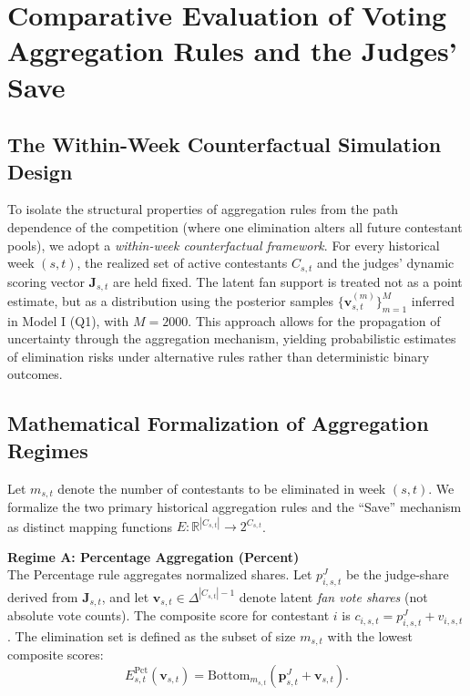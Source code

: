 \section{\textbf{Comparative Evaluation of Voting Aggregation Rules and the Judges' Save}  }
\label{sec:q2}

\subsection{The Within-Week Counterfactual Simulation Design }
\label{sec:q2_design}

To isolate the structural properties of aggregation rules from the path dependence of the competition (where one elimination alters all future contestant pools), we adopt a \emph{within-week counterfactual framework}.
For every historical week $(s,t)$, the realized set of active contestants $C_{s,t}$ and the judges' dynamic scoring vector $\mathbf{J}_{s,t}$ are held fixed. The latent fan support is treated not as a point estimate, but as a distribution using the posterior samples $\{\mathbf{v}^{(m)}_{s,t}\}_{m=1}^{M}$ inferred in Model I (Q1), with $M=2000$.
This approach allows for the propagation of uncertainty through the aggregation mechanism, yielding probabilistic estimates of elimination risks under alternative rules rather than deterministic binary outcomes.

\subsection{Mathematical Formalization of Aggregation Regimes}
\label{sec:q2_formalization}

Let $m_{s,t}$ denote the number of contestants to be eliminated in week $(s,t)$. We formalize the two primary historical aggregation rules and the ``Save'' mechanism as distinct mapping functions $E: \mathbb{R}^{|C_{s,t}|} \to 2^{C_{s,t}}$.

\noindent\textbf{Regime A: Percentage Aggregation (Percent)}
\\
The Percentage rule aggregates normalized shares. Let $p^{J}_{i,s,t}$ be the judge-share derived from $\mathbf{J}_{s,t}$, and let $\mathbf v_{s,t}\in\Delta^{|C_{s,t}|-1}$ denote latent \emph{fan vote shares} (not absolute vote counts). The composite score for contestant $i$ is $c_{i,s,t}=p^{J}_{i,s,t}+v_{i,s,t}$.
The elimination set is defined as the subset of size $m_{s,t}$ with the lowest composite scores:
\begin{equation}
    E_{s,t}^{\mathrm{Pct}}(\mathbf{v}_{s,t}) = \mathrm{Bottom}_{m_{s,t}}\left( \mathbf{p}^{J}_{s,t} + \mathbf{v}_{s,t} \right).
\end{equation}

